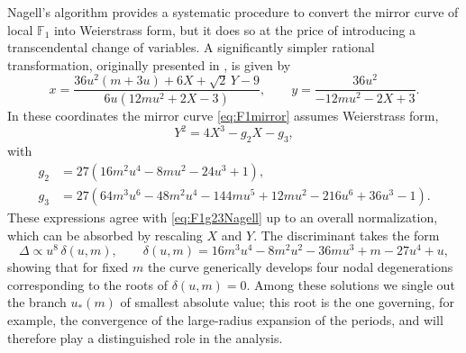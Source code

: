 \documentclass[11pt, a4paper]{article}
\numberwithin{equation}{section}
\begin{document}
Nagell's algorithm provides a systematic procedure to convert the mirror curve of local $\mathbb{F}_1$ into Weierstrass form, but it does so at the price of introducing a transcendental change of variables. A significantly simpler rational transformation, originally presented in \cite{Marino:LocalF1Notes}, is given by
\begin{equation}
  x = \frac{36 u^2 (m+3 u)+6 X+\sqrt{2}\, Y-9}{6 u \left(12 m u^2+2 X-3\right)}, 
  \qquad 
  y = \frac{36 u^2}{-12 m u^2-2 X+3}.
\end{equation}
In these coordinates the mirror curve \cref{eq:F1mirror} assumes Weierstrass form,
\begin{equation}
  Y^2 = 4X^3 - g_2 X - g_3,
\end{equation}
with
\begin{equation}\label{eq:g2g3mirrorcurve}
\begin{aligned}
  g_2 &= 27\left( 16 m^2 u^4 - 8 m u^2 - 24 u^3 + 1 \right), \\
  g_3 &= 27\left( 64 m^3 u^6 - 48 m^2 u^4 - 144 m u^5 + 12 m u^2 - 216 u^6 + 36 u^3 - 1 \right).
\end{aligned}
\end{equation}
These expressions agree with \cref{eq:F1g23Nagell} up to an overall normalization, which can be absorbed by rescaling $X$ and $Y$. The discriminant takes the form
\begin{equation}\label{eq:deltamirrorcurve}
  \Delta \propto u^8\, \delta(u,m),
  \qquad
  \delta(u,m) = 16 m^3 u^4 - 8 m^2 u^2 - 36 m u^3 + m - 27 u^4 + u,
\end{equation}
showing that for fixed $m$ the curve generically develops four nodal degenerations corresponding to the roots of $\delta(u,m)=0$. Among these solutions we single out the branch $u_{*}(m)$ of smallest absolute value; this root is the one governing, for example, the convergence of the large-radius expansion of the periods, and will therefore play a distinguished role in the analysis.
\end{document}
